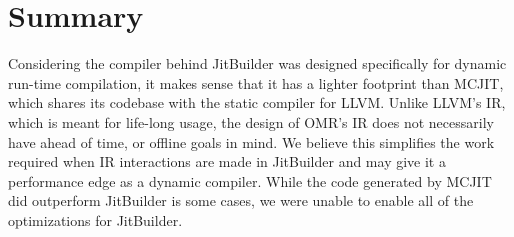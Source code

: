 \section{Summary}
\label{sec:summary}
Considering the compiler behind JitBuilder was designed specifically for dynamic run-time compilation, it makes sense that it has a lighter footprint than MCJIT, which shares its codebase with the static compiler for LLVM.
Unlike LLVM's IR, which is meant for life-long usage, the design of OMR's IR does not necessarily have ahead of time, or offline goals in mind.
We believe this simplifies the work required when IR interactions are made in JitBuilder and may give it a performance edge as a dynamic compiler.
While the code generated by MCJIT did outperform JitBuilder is some cases, we were unable to enable all of the optimizations for JitBuilder.